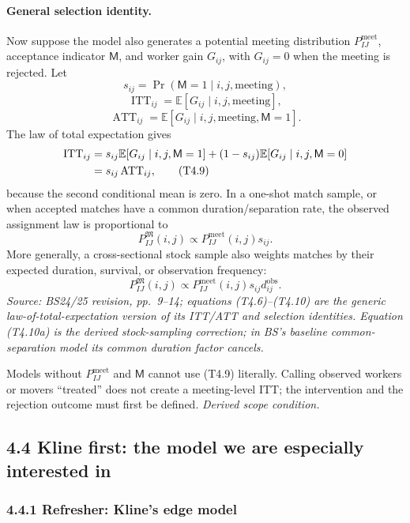 \documentclass[11pt]{article}
\begin{document}
\paragraph{General selection identity.}
Now suppose the model also generates a potential meeting distribution
\(P^{\mathrm{meet}}_{IJ}\), acceptance indicator \(\mathsf M\), and worker
gain \(G_{ij}\), with \(G_{ij}=0\) when the meeting is rejected.  Let
\[
s_{ij}
=
\Pr(\mathsf M=1\mid i,j,\text{meeting}),
\tag{T4.6}
\]
\[
\operatorname{ITT}_{ij}
=
\mathbb E[G_{ij}\mid i,j,\text{meeting}],
\tag{T4.7}
\]
\[
\operatorname{ATT}_{ij}
=
\mathbb E[G_{ij}\mid i,j,\text{meeting},\mathsf M=1].
\tag{T4.8}
\]
The law of total expectation gives
\begin{align}
\operatorname{ITT}_{ij}
&=
s_{ij}
\mathbb E[G_{ij}\mid i,j,\mathsf M=1]
+(1-s_{ij})
\mathbb E[G_{ij}\mid i,j,\mathsf M=0] \notag\\
&=
s_{ij}\operatorname{ATT}_{ij},
\tag{T4.9}
\end{align}
because the second conditional mean is zero.  In a one-shot match sample, or
when accepted matches have a common duration/separation rate, the observed
assignment law is proportional to
\[
P^{\mathfrak M}_{IJ}(i,j)
\propto
P^{\mathrm{meet}}_{IJ}(i,j)s_{ij}.
\tag{T4.10}
\]
More generally, a cross-sectional stock sample also weights matches by their
expected duration, survival, or observation frequency:
\[
P^{\mathfrak M}_{IJ}(i,j)
\propto
P^{\mathrm{meet}}_{IJ}(i,j)s_{ij}d_{ij}^{\mathrm{obs}}.
\tag{T4.10a}
\]
\textit{Source: BS24/25 revision, pp.\ 9--14; equations (T4.6)--(T4.10)
are the generic law-of-total-expectation version of its ITT/ATT and selection
identities.  Equation (T4.10a) is the derived stock-sampling correction; in
BS's baseline common-separation model its common duration factor cancels.}

Models without \(P^{\mathrm{meet}}_{IJ}\) and \(\mathsf M\) cannot use
(T4.9) literally.  Calling observed workers or movers ``treated'' does not
create a meeting-level ITT; the intervention and the rejection outcome must
first be defined.
\textit{Derived scope condition.}

\subsection{4.4 Kline first: the model we are especially interested in}

\subsubsection{4.4.1 Refresher: Kline's edge model}
\end{document}
